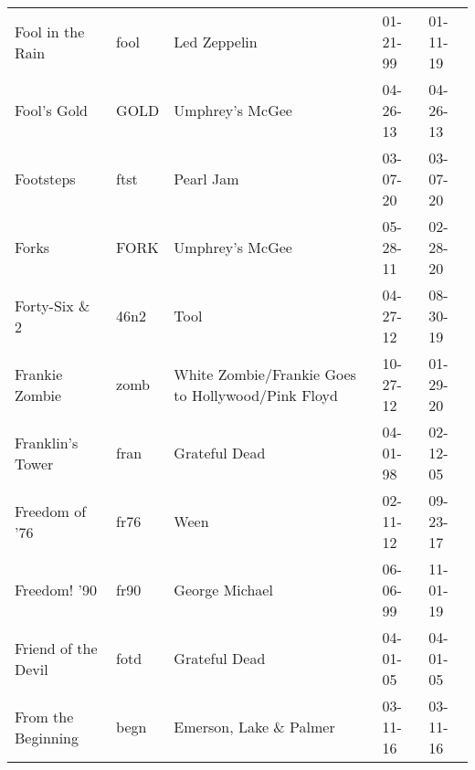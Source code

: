 \begin{longtable}{p{}p{}p{}p{}p{}}
                                                        Fool in the Rain &          fool &                                             Led Zeppelin &              01-21-99 &             01-11-19 \\
                                                             Fool's Gold &          GOLD &                                          Umphrey's McGee &              04-26-13 &             04-26-13 \\
                                                               Footsteps &          ftst &                                                Pearl Jam &              03-07-20 &             03-07-20 \\
                                                                   Forks &          FORK &                                          Umphrey's McGee &              05-28-11 &             02-28-20 \\
                                                          Forty-Six \& 2 &          46n2 &                                                     Tool &              04-27-12 &             08-30-19 \\
                                                          Frankie Zombie &          zomb &        White Zombie/Frankie Goes to Hollywood/Pink Floyd &              10-27-12 &             01-29-20 \\
                                                        Franklin's Tower &          fran &                                            Grateful Dead &              04-01-98 &             02-12-05 \\
                                                          Freedom of '76 &          fr76 &                                                     Ween &              02-11-12 &             09-23-17 \\
                                                            Freedom! '90 &          fr90 &                                           George Michael &              06-06-99 &             11-01-19 \\
                                                     Friend of the Devil &          fotd &                                            Grateful Dead &              04-01-05 &             04-01-05 \\
                                                      From the Beginning &          begn &                                  Emerson, Lake \& Palmer &              03-11-16 &             03-11-16 \\

\end{longtable}
